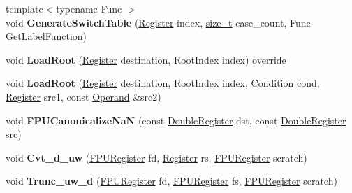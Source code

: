 \begin{DoxyCompactItemize}
\item 
\mbox{\label{classv8_1_1internal_1_1TurboAssembler_a8b7e7d1ca04f249819888b32d52477fa}} 
{\footnotesize template$<$typename Func $>$ }\\void {\bfseries Generate\+Switch\+Table} (\mbox{\hyperlink{classv8_1_1internal_1_1Register}{Register}} index, \mbox{\hyperlink{classsize__t}{size\+\_\+t}} case\+\_\+count, Func Get\+Label\+Function)
\item 
\mbox{\label{classv8_1_1internal_1_1TurboAssembler_a931af7443ae4f741ae52403554cca319}} 
void {\bfseries Load\+Root} (\mbox{\hyperlink{classv8_1_1internal_1_1Register}{Register}} destination, Root\+Index index) override
\item 
\mbox{\label{classv8_1_1internal_1_1TurboAssembler_a363087718f21ea12943c36ba85c4d698}} 
void {\bfseries Load\+Root} (\mbox{\hyperlink{classv8_1_1internal_1_1Register}{Register}} destination, Root\+Index index, Condition cond, \mbox{\hyperlink{classv8_1_1internal_1_1Register}{Register}} src1, const \mbox{\hyperlink{classv8_1_1internal_1_1Operand}{Operand}} \&src2)
\item 
\mbox{\label{classv8_1_1internal_1_1TurboAssembler_a32a55181ed3a406f18976a1e75101878}} 
void {\bfseries F\+P\+U\+Canonicalize\+NaN} (const \mbox{\hyperlink{classv8_1_1internal_1_1DoubleRegister}{Double\+Register}} dst, const \mbox{\hyperlink{classv8_1_1internal_1_1DoubleRegister}{Double\+Register}} src)
\item 
\mbox{\label{classv8_1_1internal_1_1TurboAssembler_a969af89220084db6f36f47ce46ce48c5}} 
void {\bfseries Cvt\+\_\+d\+\_\+uw} (\mbox{\hyperlink{classv8_1_1internal_1_1FPURegister}{F\+P\+U\+Register}} fd, \mbox{\hyperlink{classv8_1_1internal_1_1Register}{Register}} rs, \mbox{\hyperlink{classv8_1_1internal_1_1FPURegister}{F\+P\+U\+Register}} scratch)
\item 
\mbox{\label{classv8_1_1internal_1_1TurboAssembler_aacf3d4f21776ffd5df514e451c957447}} 
void {\bfseries Trunc\+\_\+uw\+\_\+d} (\mbox{\hyperlink{classv8_1_1internal_1_1FPURegister}{F\+P\+U\+Register}} fd, \mbox{\hyperlink{classv8_1_1internal_1_1FPURegister}{F\+P\+U\+Register}} fs, \mbox{\hyperlink{classv8_1_1internal_1_1FPURegister}{F\+P\+U\+Register}} scratch)

\end{DoxyCompactItemize}
